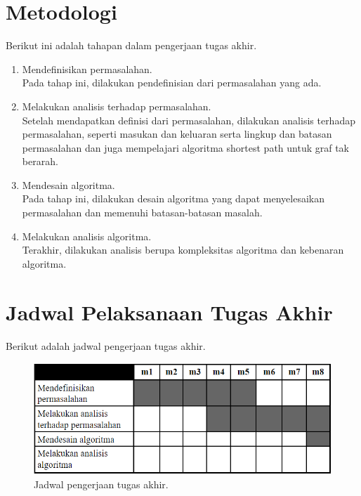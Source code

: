 \section{Metodologi}

Berikut ini adalah tahapan dalam pengerjaan tugas akhir.

\begin{enumerate}
    \item Mendefinisikan permasalahan.\\
    Pada tahap ini, dilakukan pendefinisian dari permasalahan yang ada.
    \item Melakukan analisis terhadap permasalahan.\\
    Setelah mendapatkan definisi dari permasalahan, dilakukan analisis terhadap permasalahan, seperti masukan dan keluaran serta lingkup dan batasan permasalahan dan juga mempelajari algoritma shortest path untuk graf tak berarah.
    \item Mendesain algoritma.\\
    Pada tahap ini, dilakukan desain algoritma yang dapat menyelesaikan permasalahan dan memenuhi batasan-batasan masalah.
    \item Melakukan analisis algoritma.\\
    Terakhir, dilakukan analisis berupa kompleksitas algoritma dan kebenaran algoritma.
\end{enumerate}

\section{Jadwal Pelaksanaan Tugas Akhir}

Berikut adalah jadwal pengerjaan tugas akhir.

\begin{figure}[H]
    \centering
    \includegraphics[width=1.0\textwidth]{resources/jadwa_pengerjaan.png}
    \caption{Jadwal pengerjaan tugas akhir.}
\end{figure}

